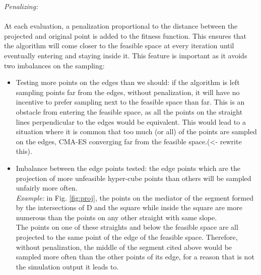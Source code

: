 \emph{Penalizing:}\\
\\
At each evaluation, a penalization proportional to the distance between the projected and original point is added to the fitness function. This ensures that the algorithm will come closer to the feasible space at every iteration until eventually entering and staying inside it. This feature is important as it avoids two imbalances on the sampling:
\begin{itemize}
	\item Testing more points on the edges than we should: if the algorithm is left sampling points far from the edges, without penalization, it will have no incentive to prefer sampling next to the feasible space than far. This is an obstacle from entering the feasible space, as all the points on the straight lines perpendicular to the edges would be equivalent. This would lead to a situation where it is common that too much (or all) of the points are sampled on the edges, CMA-ES converging far from the feasible space.\color{red}(<- rewrite this)\color{black}.
	\item Imbalance between the edge points tested: the edge points which are the projection of more unfeasible hyper-cube points than others will be sampled unfairly more often.\\
	\emph{Example:} in Fig. \ref{fig:proj}, the points on the mediator of the segment formed by the intersections of D and the square while inside the square are more numerous than the points on any other straight with same slope.\\
The points on one of these straights and below the feasible space are all projected to the same point of the edge of the feasible space. Therefore, without penalization, the middle of the segment cited above would be sampled more often than the other points of its edge, for a reason that is not the simulation output it leads to. 
\end{itemize}

